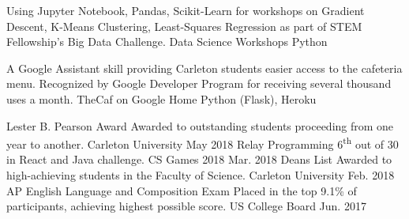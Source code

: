\documentclass[]{awesome-cv}
\begin{document}
\vspace{-4mm}
\begin{cventries}
    \cventry
        {Using Jupyter Notebook, Pandas, Scikit-Learn for workshops on Gradient Descent, K-Means Clustering, Least-Squares Regression as part of STEM Fellowship's Big Data Challenge.}
        {Data Science Workshops}
        {Python}
        {}
        {}
   	
    \vspace{-5.5mm}
    \cventry
	{A Google Assistant skill providing Carleton students easier access to the cafeteria menu. Recognized by Google Developer Program for receiving several thousand uses a month.}
	{TheCaf on Google Home}
	{Python (Flask), Heroku}
	{}
    {}
\end{cventries}

\vspace{-5mm}
\begin{cvhonors}
	\cvhonor
	{Lester B. Pearson Award}
	{Awarded to outstanding students proceeding from one year to another.}
	{Carleton University}
	{May 2018}
    \cvhonor
    {Relay Programming}
	{6\textsuperscript{th} out of 30 in React and Java challenge.}
	{CS Games 2018}
	{Mar. 2018}
	\cvhonor
    {Dean\textquotesingle{}s List}
	{Awarded to high-achieving students in the Faculty of Science.}
	{Carleton University}
	{Feb. 2018}
	\cvhonor
	{AP English Language and Composition Exam}
	{Placed in the top 9.1\% of participants, achieving highest possible score.}
	{US College Board}
	{Jun. 2017}
\end{cvhonors}
\ 
\end{document}

